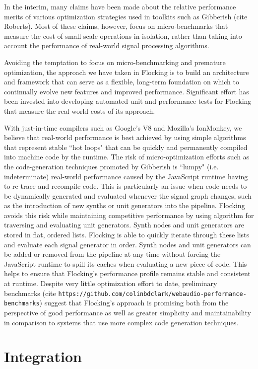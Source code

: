\documentclass{article}
\begin{document}
In the interim, many claims have been made about the relative performance merits of various optimization strategies used in toolkits such as Gibberish (cite Roberts). Most of these claims, however, focus on micro-benchmarks that measure the cost of small-scale operations in isolation, rather than taking into account the performance of real-world signal processing algorithms.

Avoiding the temptation to focus on micro-benchmarking and premature optimization, the approach we have taken in Flocking is to build an architecture and framework that can serve as a flexible, long-term foundation on which to continually evolve new features and improved performance. Significant effort has been invested into developing automated unit and performance tests for Flocking that measure the real-world costs of its approach.

With just-in-time compilers such as Google's V8 and Mozilla's IonMonkey, we believe that real-world performance is best achieved by using simple algorithms that represent stable ``hot loops" that can be quickly and permanently  compiled into machine code by the runtime. The risk of micro-optimization efforts such as the code-generation techniques promoted by Gibberish is ``lumpy" (i.e. indeterminate) real-world performance caused by the JavaScript runtime having to re-trace and recompile code. This is particularly an issue when code needs to be dynamically generated and evaluated whenever the signal graph changes, such as the introduction of new synths or unit generators into the pipeline. Flocking avoids this risk while maintaining competitive performance by using algorithm for traversing and evaluating unit generators. Synth nodes and unit generators are stored in flat, ordered lists. Flocking is able to quickly iterate through these lists and evaluate each signal generator in order. Synth nodes and unit generators can be added or removed from the pipeline at any time without forcing the JavaScript runtime to spill its caches when evaluating a new piece of code. This helps to ensure that Flocking's performance profile remains stable and consistent at runtime. Despite very little optimization effort to date, preliminary benchmarks (cite \verb|https://github.com/colinbdclark/webaudio-performance-benchmarks|) suggest that Flocking's approach is promising both from the perspective of good performance as well as greater simplicity and maintainability in comparison to systems that use more complex code generation techniques.

\section{Integration}
\end{document}

